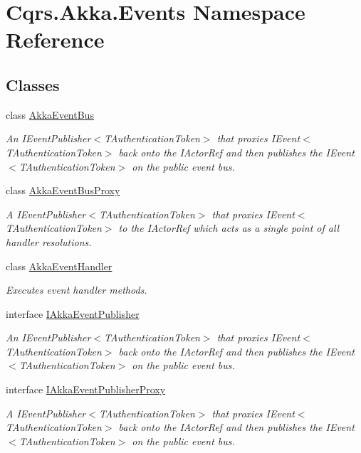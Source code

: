 \hypertarget{namespaceCqrs_1_1Akka_1_1Events}{}\section{Cqrs.\+Akka.\+Events Namespace Reference}
\label{namespaceCqrs_1_1Akka_1_1Events}
\subsection*{Classes}
\begin{DoxyCompactItemize}
\item 
class \hyperlink{classCqrs_1_1Akka_1_1Events_1_1AkkaEventBus}{Akka\+Event\+Bus}
\begin{DoxyCompactList}\small\item\em An I\+Event\+Publisher$<$\+T\+Authentication\+Token$>$ that proxies I\+Event$<$\+T\+Authentication\+Token$>$ back onto the I\+Actor\+Ref and then publishes the I\+Event$<$\+T\+Authentication\+Token$>$ on the public event bus. \end{DoxyCompactList}\item 
class \hyperlink{classCqrs_1_1Akka_1_1Events_1_1AkkaEventBusProxy}{Akka\+Event\+Bus\+Proxy}
\begin{DoxyCompactList}\small\item\em A I\+Event\+Publisher$<$\+T\+Authentication\+Token$>$ that proxies I\+Event$<$\+T\+Authentication\+Token$>$ to the I\+Actor\+Ref which acts as a single point of all handler resolutions. \end{DoxyCompactList}\item 
class \hyperlink{classCqrs_1_1Akka_1_1Events_1_1AkkaEventHandler}{Akka\+Event\+Handler}
\begin{DoxyCompactList}\small\item\em Executes event handler methods. \end{DoxyCompactList}\item 
interface \hyperlink{interfaceCqrs_1_1Akka_1_1Events_1_1IAkkaEventPublisher}{I\+Akka\+Event\+Publisher}
\begin{DoxyCompactList}\small\item\em An I\+Event\+Publisher$<$\+T\+Authentication\+Token$>$ that proxies I\+Event$<$\+T\+Authentication\+Token$>$ back onto the I\+Actor\+Ref and then publishes the I\+Event$<$\+T\+Authentication\+Token$>$ on the public event bus. \end{DoxyCompactList}\item 
interface \hyperlink{interfaceCqrs_1_1Akka_1_1Events_1_1IAkkaEventPublisherProxy}{I\+Akka\+Event\+Publisher\+Proxy}
\begin{DoxyCompactList}\small\item\em A I\+Event\+Publisher$<$\+T\+Authentication\+Token$>$ that proxies I\+Event$<$\+T\+Authentication\+Token$>$ back onto the I\+Actor\+Ref and then publishes the I\+Event$<$\+T\+Authentication\+Token$>$ on the public event bus. \end{DoxyCompactList}\end{DoxyCompactItemize}
